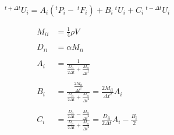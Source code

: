 \begin{equation}
\label{eq:displacement-vector-reduced}
^{t+\Delta t}U_i = A_i(^tP_i - \ ^tF_i) + B_i \ ^tU_i + C_i \ ^{t-\Delta t}U_i
\end{equation}

\begin{equation}
\label{eq:vector_component_abc}
\begin{aligned}
M_{ii} &= \frac{1}{4} \rho V \\ \\
D_{ii} &= \alpha M_{ii} \\ \\
A_i &= \frac{1}{\frac{D_{ii}}{2 \Delta t} + \frac{M_{ii}}{\Delta t^2}}\\ \\
B_i &= \frac{\frac{2M_{ii}}{\Delta t^2}}{\frac{D_{ii}}{2 \Delta t} +
  \frac{M_{ii}}{\Delta t^2}} = \frac{2M_{ii}}{\Delta t^2}A_i \\ \\
C_i &= \frac{\frac{D_{ii}}{2 \Delta t} - \frac{M_{ii}}{\Delta
    t^2}}{\frac{D_{ii}}{2 \Delta t} + \frac{M_{ii}}{\Delta t^2}} = 
\frac{D_{ii}}{2\Delta t}A_i - \frac{B_i}{2} \\
\end{aligned}
\end{equation}


 





